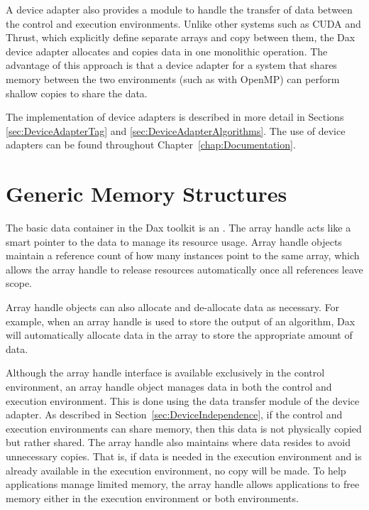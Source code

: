 A device adapter also provides a module to handle the transfer of data
between the control and execution environments. Unlike other systems such
as CUDA and Thrust, which explicitly define separate arrays and copy
between them, the Dax device adapter allocates and copies data in one
monolithic operation. The advantage of this approach is that a device
adapter for a system that shares memory between the two environments (such
as with OpenMP) can perform shallow copies to share the data.

The implementation of device adapters is described in more detail in
Sections \ref{sec:DeviceAdapterTag} and
\ref{sec:DeviceAdapterAlgorithms}. The use of device adapters can be found
throughout Chapter~\ref{chap:Documentation}.



\section{Generic Memory Structures}
\label{sec:GenericMemoryStructures}


The basic data container in the Dax toolkit is an . The array handle acts like a smart pointer to the data to manage
its resource usage. Array handle objects maintain a reference count of how
many instances point to the same array, which allows the array handle to
release resources automatically once all references leave scope.

Array handle objects can also allocate and de-allocate data as
necessary. For example, when an array handle is used to store the output of
an algorithm, Dax will automatically allocate data in the array to store
the appropriate amount of data.

Although the array handle interface is available exclusively in the control
environment, an array handle object manages data in both the control and
execution environment. This is done using the data transfer module of the
device adapter.  As described in
Section~\ref{sec:DeviceIndependence}, if the control and execution
environments can share memory, then this data is not physically copied but
rather shared. The array handle also maintains where data resides to avoid
unnecessary copies. That is, if data is needed in the execution environment
and is already available in the execution environment, no copy will be
made. To help applications manage limited memory, the array handle allows
applications to free memory either in the execution environment or both
environments.

